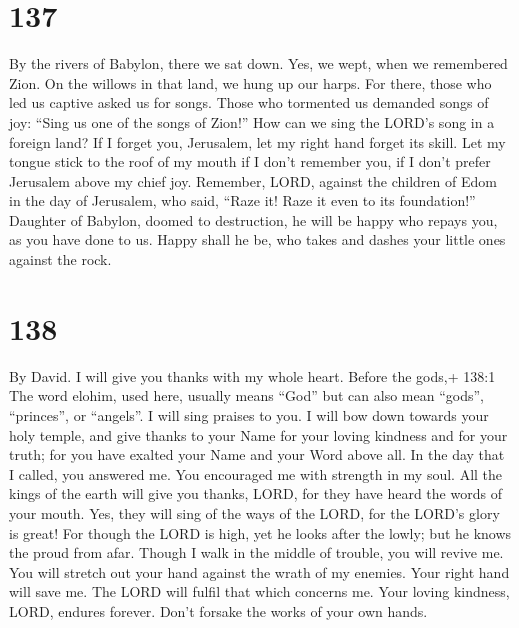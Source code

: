 \hypertarget{section-127}{%
\section{137}\label{section-127}}

 By the rivers of Babylon, there we sat down. Yes, we wept,
when we remembered Zion.  On the willows in that land, we
hung up our harps.  For there, those who led us captive
asked us for songs. Those who tormented us demanded songs of joy: ``Sing
us one of the songs of Zion!''  How can we sing the LORD's
song in a foreign land?  If I forget you, Jerusalem, let my
right hand forget its skill.  Let my tongue stick to the
roof of my mouth if I don't remember you, if I don't prefer Jerusalem
above my chief joy.  Remember, LORD, against the children of
Edom in the day of Jerusalem, who said, ``Raze it! Raze it even to its
foundation!''  Daughter of Babylon, doomed to destruction,
he will be happy who repays you, as you have done to us. 
Happy shall he be, who takes and dashes your little ones against the
rock.

\hypertarget{section-128}{%
\section{138}\label{section-128}}

By David.  I will give you thanks with my whole heart.
Before the gods,+ 138:1 The word elohim, used here, usually means
``God'' but can also mean ``gods'', ``princes'', or ``angels''. I will
sing praises to you.  I will bow down towards your holy
temple, and give thanks to your Name for your loving kindness and for
your truth; for you have exalted your Name and your Word above all.
 In the day that I called, you answered me. You encouraged
me with strength in my soul.  All the kings of the earth
will give you thanks, LORD, for they have heard the words of your mouth.
 Yes, they will sing of the ways of the LORD, for the LORD's
glory is great!  For though the LORD is high, yet he looks
after the lowly; but he knows the proud from afar.  Though I
walk in the middle of trouble, you will revive me. You will stretch out
your hand against the wrath of my enemies. Your right hand will save me.
 The LORD will fulfil that which concerns me. Your loving
kindness, LORD, endures forever. Don't forsake the works of your own
hands.

